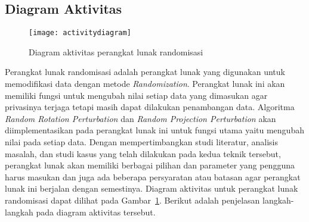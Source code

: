 \subsection{Diagram Aktivitas}
\label{subsec:diagram-aktivitas}

\begin{figure}
    \centering
    \texttt{[image: activitydiagram]}
    \caption{Diagram aktivitas perangkat lunak randomisasi}
    \label{fig:activitydiagram}
\end{figure}

Perangkat lunak randomisasi adalah perangkat lunak yang digunakan untuk memodifikasi data dengan metode \textit{Randomization}. Perangkat lunak ini akan memiliki fungsi untuk mengubah nilai setiap data yang dimasukan agar privasinya terjaga tetapi masih dapat dilakukan penambangan data. Algoritma \textit{Random Rotation Perturbation} dan \textit{Random Projection Perturbation} akan diimplementasikan pada perangkat lunak ini untuk fungsi utama yaitu mengubah nilai pada setiap data. Dengan mempertimbangkan studi literatur, analisis masalah, dan studi kasus yang telah dilakukan pada kedua teknik tersebut, perangkat lunak akan memiliki berbagai pilihan dan parameter yang pengguna harus masukan dan juga ada beberapa persyaratan atau batasan agar perangkat lunak ini berjalan dengan semestinya. Diagram aktivitas untuk perangkat lunak randomisasi dapat dilihat pada Gambar~\ref{fig:activitydiagram}. Berikut adalah penjelasan langkah-langkah pada diagram aktivitas tersebut.
